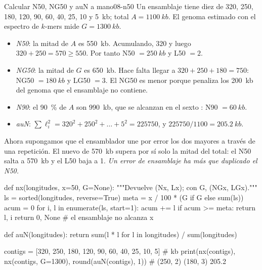\begin{ejemplo}{Calcular N50, NG50 y auN a mano}{08-n50}
Un ensamblaje tiene diez  de 320, 250, 180, 120, 90, 60, 40, 25, 10 y \SI{5}{kb}; total $A=\SI{1100}{kb}$. El genoma estimado con el espectro de $k$-mers mide $G=\SI{1300}{kb}$.
\begin{itemize}
  \item \emph{N50}: la mitad de $A$ es \SI{550}{kb}. Acumulando, $320$ y luego $320+250=570\ge550$. Por tanto N50 $=\SI{250}{kb}$ y L50 $=2$.
  \item \emph{NG50}: la mitad de $G$ es \SI{650}{kb}. Hace falta llegar a $320+250+180=750$: NG50 $=\SI{180}{kb}$ y LG50 $=3$. El NG50 es menor porque penaliza los \SI{200}{kb} del genoma que el ensamblaje no contiene.
  \item \emph{N90}: el \SI{90}{\percent} de $A$ son \SI{990}{kb}, que se alcanzan en el sexto : N90 $=\SI{60}{kb}$.
  \item \emph{auN}: $\sum\ell_i^2 = 320^2+250^2+\dots+5^2 = \num{225750}$, y $\num{225750}/1100=\SI{205,2}{kb}$.
\end{itemize}
Ahora supongamos que el ensamblador une por error los dos  mayores a través de una repetición. El nuevo  de \SI{570}{kb} supera por sí solo la mitad del total: el N50 salta a \SI{570}{kb} y el L50 baja a 1. \emph{Un error de ensamblaje ha más que duplicado el N50.}
\end{ejemplo}

\begin{codigo}[n50.py]
def nx(longitudes, x=50, G=None):
    """Devuelve (Nx, Lx); con G, (NGx, LGx)."""
    ls = sorted(longitudes, reverse=True)
    meta = x / 100 * (G if G else sum(ls))
    acum = 0
    for i, l in enumerate(ls, start=1):
        acum += l
        if acum >= meta:
            return l, i
    return 0, None           # el ensamblaje no alcanza x%

def auN(longitudes):
    return sum(l * l for l in longitudes) / sum(longitudes)

contigs = [320, 250, 180, 120, 90, 60, 40, 25, 10, 5]   # kb
print(nx(contigs), nx(contigs, G=1300), round(auN(contigs), 1))
# (250, 2) (180, 3) 205.2
\end{codigo}

